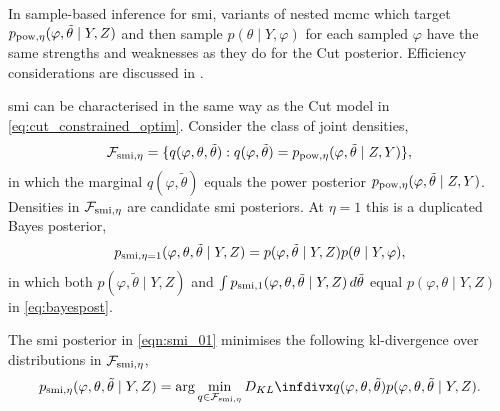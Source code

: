 In sample-based inference for \acrshort*{smi}, variants of nested \acrshort*{mcmc} \citep{Plummer2015cut} which target $p_{\operatorname{\text{pow}}, \eta}(\varphi,\tilde\theta \mid Y,Z)$ and then sample $p(\theta \mid Y,\varphi)$ for each sampled $\varphi$ have the same strengths and weaknesses as they do for the Cut posterior. Efficiency considerations are discussed in \cite{Carmona2020smi}.

\acrshort*{smi} can be characterised in the same way as the Cut model in \cref{eq:cut_constrained_optim}.
Consider the class of joint densities,
\[
  \mathcal{F}_{\operatorname{\text{smi}},\eta} = \{q(\varphi,\theta,\tilde\theta) : q(\varphi,\tilde\theta) = p_{\operatorname{\text{pow}}, \eta}(\varphi,\tilde\theta \mid Z, Y)\},
\]
in which the marginal $q(\varphi,\tilde\theta)$ equals the power posterior $p_{\operatorname{\text{pow}}, \eta}(\varphi,\tilde\theta \mid Z, Y)$.
Densities in $\mathcal{F}_{\operatorname{\text{smi}},\eta}$ are candidate \acrshort*{smi} posteriors.
At $\eta=1$ this is a duplicated Bayes posterior,
\[
  p_{\operatorname{\text{smi}},\eta=1}(\varphi,\theta,\tilde\theta \mid Y,Z)=p(\varphi,\tilde\theta \mid Y,Z) p(\theta \mid Y,\varphi),
\]
in which both $p(\varphi,\tilde\theta \mid Y,Z)$ and $\int p_{\operatorname{\text{smi}},1}(\varphi,\theta,\tilde\theta \mid Y,Z)\,d\tilde\theta$ equal $p(\varphi,\theta \mid Y,Z)$ in \cref{eq:bayespost}.
\begin{proposition}
  The \acrshort*{smi} posterior in \cref{eqn:smi_01} minimises the following \acrshort*{kl}-divergence over distributions in $\mathcal{F}_{\operatorname{\text{smi}},\eta}$,
  \begin{equation}\label{eqn:smi_as_F_minimiser}
    p_{\smi,\eta}(\varphi,\theta,\tilde\theta \mid Y,Z)=\arg\min_{q\in \mathcal{F}_{\smi,\eta}} \kl{q(\varphi,\theta,\tilde\theta)}{ p(\varphi,\theta,\tilde\theta\mid Y,Z)}.
  \end{equation}
\end{proposition}
